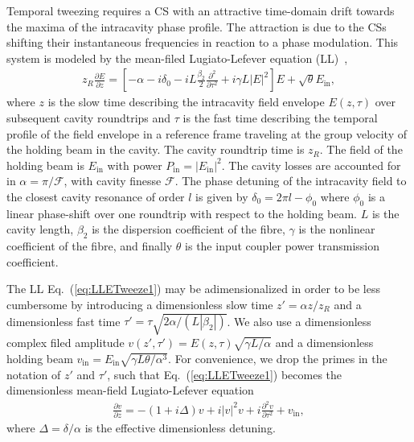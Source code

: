 \documentclass[aps,floatfix,showpacs,preprintnumbers,twocolumn,nofootinbib]{revtex4}
\begin{document}
Temporal tweezing requires a CS with an attractive time-domain drift towards the maxima of the intracavity phase profile.  The attraction is due to the CSs shifting their instantaneous frequencies in reaction to a phase modulation.   This system is modeled by the mean-filed Lugiato-Lefever equation (LL)~\cite{tweeze,LL,LLE},
\begin{align}
z_R \frac{\partial E }{\partial z} = \left[ -\alpha - i \delta_0 - i L \frac{\beta_2}{2} \frac{\partial^2}{\partial \tau^2} + i \gamma L |E|^2 \right] E + \sqrt{\theta}E_{\mathrm{in}},
\label{eq:LLETweeze1}
\end{align}
where $z$ is the slow time describing the intracavity field envelope $E(z,\tau)$ over subsequent cavity roundtrips and $\tau$ is the fast time describing the temporal profile of the field envelope in a reference frame traveling at the group velocity of the holding beam in the cavity.  The cavity roundtrip time is $z_R$.  The field of the holding beam is $E_{\mathrm{in}}$ with power $P_{\mathrm{in}} = |E_{\mathrm{in}}|^2$.  The cavity losses are accounted for in $\alpha = \pi/\mathscr{F}$, with cavity finesse $\mathscr{F}$.  The phase detuning of the intracavity field to the closest cavity resonance of order $l$ is given by $\delta_0 = 2\pi l - \phi_0$ where $\phi_0$ is a linear phase-shift over one roundtrip with respect to the holding beam.  $L$ is the cavity length, $\beta_2$ is the dispersion coefficient of the fibre, $\gamma$ is the nonlinear coefficient of the fibre, and finally $\theta$ is the input coupler power transmission coefficient.  

The LL Eq.~(\ref{eq:LLETweeze1}) may be adimensionalized in order to be less cumbersome by introducing a dimensionless slow time $z' = \alpha z / z_R$ and a dimensionless fast time $\tau' = \tau \sqrt{2\alpha /(L |\beta_2|)}$.  We also use a dimensionless complex filed amplitude $v(z',\tau') = E(z,\tau) \sqrt{\gamma L/\alpha}$ and a dimensionless holding beam $v_{\mathrm{in}} = E_{\mathrm{in}}\sqrt{\gamma L \theta /\alpha^3}$.  For convenience, we drop the primes in the notation of $z'$ and $\tau'$, such that Eq.~(\ref{eq:LLETweeze1}) becomes the dimensionless mean-field Lugiato-Lefever equation 
\begin{align}
\frac{\partial v }{\partial z} = -(1+i \Delta) v + i |v|^2 v + i \frac{\partial^2 v }{\partial \tau^2} + v_{\mathrm{in}},
\label{eq:dimensionlessLLE}
\end{align}
where $\Delta = \delta/\alpha$ is the effective dimensionless detuning.  
\end{document}
